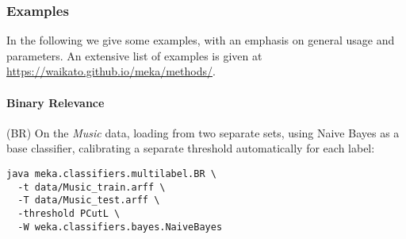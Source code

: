 \documentclass[11pt]{article}
\newcommand{\MEKA}{Meka}
\begin{document}

\subsubsection{Examples} 
\label{sec:examples}

In the following we give some examples, with an emphasis on general usage and parameters. An extensive list of examples is given at \url{https://waikato.github.io/meka/methods/}.



\paragraph{Binary Relevance} (BR) On the \textit{Music} data, loading from two separate sets, using Naive Bayes as a base classifier, calibrating a separate threshold automatically for each label: 
\begin{lstlisting}
java meka.classifiers.multilabel.BR \
  -t data/Music_train.arff \
  -T data/Music_test.arff \
  -threshold PCutL \
  -W weka.classifiers.bayes.NaiveBayes
\end{lstlisting}
\end{document}
